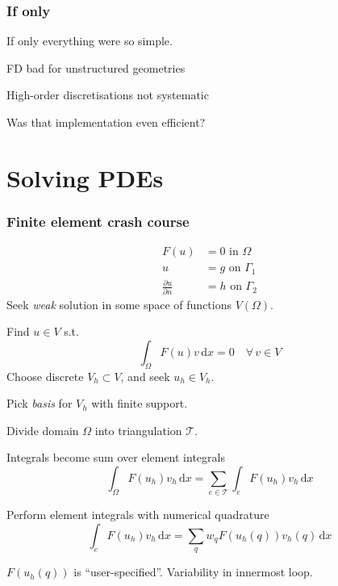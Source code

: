 \documentclass[presentation]{beamer}
\begin{document}
\begin{frame}
  \frametitle{If only}
  If only everything were so simple.

  FD bad for unstructured geometries

  High-order discretisations not systematic

  Was that implementation even efficient?
\end{frame}

\section{Solving PDEs}

\begin{frame}[allowframebreaks]
  \frametitle{Finite element crash course}
  \begin{align*}
    F(u) &= 0 \text{ in $\Omega$}\\
    u &= g \text{ on $\Gamma_1$}\\
    \frac{\partial u}{\partial n} &= h \text{ on $\Gamma_2$}
  \end{align*}
  Seek \emph{weak} solution in some space of functions $V(\Omega)$.

  Find $u\in V$ s.t.
\begin{equation*}
\int_\Omega \!F(u) v\, \text{d}x = 0 \quad \forall\, v \in V
\end{equation*}
Choose discrete $V_h \subset V$, and seek $u_h \in V_h$.

Pick \emph{basis} for $V_h$ with finite support.

\pagebreak
Divide domain $\Omega$ into triangulation $\mathcal{T}$.

Integrals become sum over element integrals
\begin{equation*}
  \int_\Omega\! F(u_h) v_h \, \text{d}x =
  \sum_{e \in \mathcal{T}} \int_e\! F(u_h)v_h\, \text{d}x
\end{equation*}

Perform element integrals with numerical quadrature
\begin{equation*}
  \int_e F(u_h)v_h\,\text{d}x = \sum_q w_q F(u_h(q)) v_h(q)\,\text{d}x
\end{equation*}

$F(u_h(q))$ is ``user-specified''.  Variability in innermost loop.
\end{frame}
\end{document}
